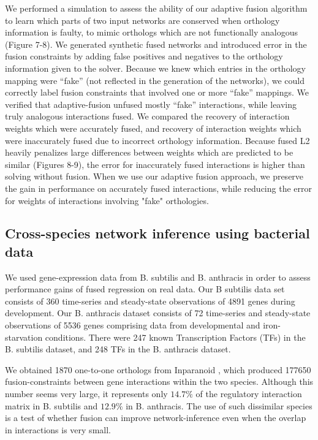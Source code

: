 \documentclass[11pt]{article}
\begin{document}
We performed a simulation to assess the ability of our adaptive fusion algorithm to learn which parts of two input networks are conserved when orthology information is faulty, to mimic orthologs which are not functionally analogous  (Figure 7-8). We generated synthetic fused networks and introduced error in the fusion constraints by adding false positives and negatives to the orthology information given to the solver. Because we knew which entries in the orthology mapping were ``fake'' (not reflected in the generation of the networks), we could correctly label fusion constraints that involved one or more ``fake'' mappings. We verified that adaptive-fusion unfused mostly ``fake'' interactions, while leaving truly analogous interactions fused. We compared the recovery of interaction weights which were accurately fused, and recovery of interaction weights which were inaccurately fused due to incorrect orthology information. Because fused L2 heavily penalizes large differences between weights which are predicted to be similar (Figures 8-9), the error for inaccurately fused interactions is higher than solving without fusion. When we use our adaptive fusion approach, we preserve the gain in performance on accurately fused interactions, while reducing the error for weights of interactions involving "fake" orthologies. 

\subsection{Cross-species network inference using bacterial data}
We used gene-expression data from B. subtilis and B. anthracis in order to assess performance gains of fused regression on real data. Our B subtilis data set consists of 360 time-series and steady-state observations of 4891 genes during development. Our B. anthracis dataset consists of 72 time-series and steady-state observations of 5536 genes comprising data from developmental and iron-starvation conditions. There were 247 known Transcription Factors (TFs) in the B. subtilis dataset, and 248 TFs in the B. anthracis dataset. 

We obtained 1870 one-to-one orthologs from Inparanoid \cite{ostlund_inparanoid_2010}, which produced 177650 fusion-constraints between gene interactions within the two species. Although this number seems very large, it represents only $14.7\%$ of the regulatory interaction matrix in B. subtilis and $12.9\%$ in B. anthracis. The use of such dissimilar species is a test of whether fusion can improve network-inference even when the overlap in interactions is very small. 
\end{document}
